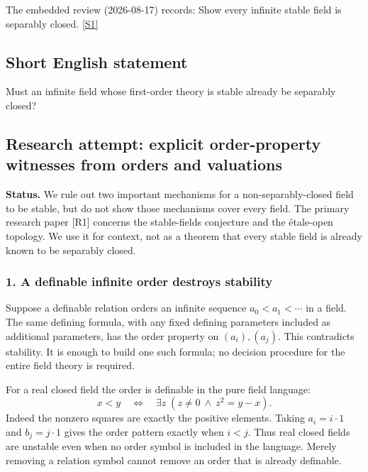 \documentclass[11pt,a4paper]{article}
\newcommand{\sref}[2]{\hyperlink{source:#1:#2}{[S#2]}}
\begin{document}
The embedded review (2026-08-17) records: Show every infinite stable field is separably closed. \sref{statement}{1}

\subsection{Short English statement}

Must an infinite field whose first-order theory is stable already be separably closed?

\subsection{Research attempt: explicit order-property witnesses from orders and valuations}
\textbf{Status.} We rule out two important mechanisms for a non-separably-closed field to be stable, but do not show those mechanisms cover every field. The primary research paper [R1] concerns the stable-fields conjecture and the étale-open topology. We use it for context, not as a theorem that every stable field is already known to be separably closed.

\subsubsection{1. A definable infinite order destroys stability}
Suppose a definable relation orders an infinite sequence $a_0<a_1<\cdots$ in a field. The same defining formula, with any fixed defining parameters included as additional parameters, has the order property on $(a_i),(a_j)$. This contradicts stability. It is enough to build one such formula; no decision procedure for the entire field theory is required.

For a real closed field the order is definable in the pure field language:
\[x<y\quad\Longleftrightarrow\quad
\exists z\;(z\ne0\ \wedge\ z^2=y-x).
\]
Indeed the nonzero squares are exactly the positive elements. Taking $a_i=i\cdot1$ and $b_j=j\cdot1$ gives the order pattern exactly when $i<j$. Thus real closed fields are unstable even when no order symbol is included in the language. Merely removing a relation symbol cannot remove an order that is already definable.
\end{document}
